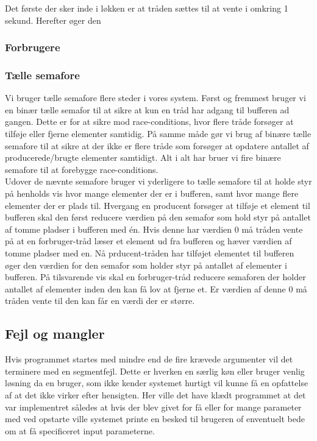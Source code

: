 \documentclass[main.tex]{subfile}
\begin{document}
Det første der sker inde i løkken er at tråden sættes til at vente i omkring 1 sekund. Herefter øger den 

\subsubsection{Forbrugere}


\subsubsection{Tælle semafore}
Vi bruger tælle semafore flere steder i vores system. Først og fremmest bruger vi en binær tælle semafor til at sikre at kun en tråd har adgang til bufferen ad gangen. Dette er for at sikre mod race-conditions, hvor flere tråde forsøger at tilføje eller fjerne elementer samtidig. På samme måde gør vi brug af binære tælle semafore til at sikre at der ikke er flere tråde som forsøger at opdatere antallet af producerede/brugte elementer samtidigt. Alt i alt har bruer vi fire binære semafore til at forebygge race-conditions.\\

Udover de nævnte semafore bruger vi yderligere to tælle semafore til at holde styr på henholds vis hvor mange elementer der er i bufferen, samt hvor mange flere elementer der er plads til. 
Hvergang en producent forsøger at tilføje et element til bufferen skal den først reducere værdien på den semafor som hold styr på antallet af tomme pladser i bufferen med én. Hvis denne har værdien 0 må tråden vente på at en forbruger-tråd læser et element ud fra bufferen og hæver værdien af tomme pladser med en. Nå prducent-tråden har tilføjet elementet til bufferen øger den værdien for den semafor som holder styr på antallet af elementer i bufferen. På tilsvarende vis skal en forbruger-tråd reducere semaforen der holder antallet af elementer inden den kan få lov at fjerne et. Er værdien af denne 0 må tråden vente til den kan får en værdi der er større.

\subsection{Fejl og mangler}
Hvis programmet startes med mindre end de fire krævede argumenter vil det terminere med en segmentfejl. Dette er hverken en særlig køn eller bruger venlig løsning da en bruger, som ikke kender systemet hurtigt vil kunne få en opfattelse af at det ikke virker efter hensigten. Her ville det have klædt programmet at det var implementret således at hvis der blev givet for få eller for mange parameter med ved opstarte ville systemet printe en besked til brugeren of enventuelt bede om at få specificeret input parameterne. 
\end{document}
